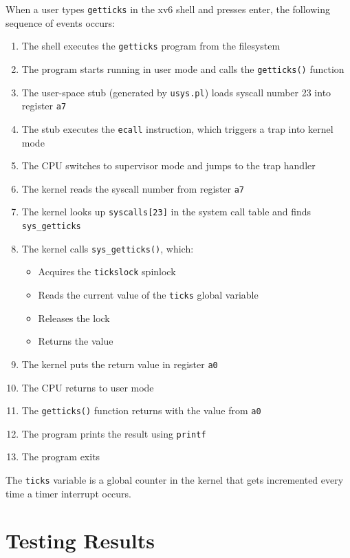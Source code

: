 \documentclass[a4paper]{article}
\begin{document}
When a user types \texttt{getticks} in the xv6 shell and presses enter, the following sequence of events occurs:

\begin{enumerate}
    \item The shell executes the \texttt{getticks} program from the filesystem
    \item The program starts running in user mode and calls the \texttt{getticks()} function
    \item The user-space stub (generated by \texttt{usys.pl}) loads syscall number 23 into register \texttt{a7}
    \item The stub executes the \texttt{ecall} instruction, which triggers a trap into kernel mode
    \item The CPU switches to supervisor mode and jumps to the trap handler
    \item The kernel reads the syscall number from register \texttt{a7}
    \item The kernel looks up \texttt{syscalls[23]} in the system call table and finds \texttt{sys\_getticks}
    \item The kernel calls \texttt{sys\_getticks()}, which:
    \begin{itemize}
        \item Acquires the \texttt{tickslock} spinlock
        \item Reads the current value of the \texttt{ticks} global variable
        \item Releases the lock
        \item Returns the value
    \end{itemize}
    \item The kernel puts the return value in register \texttt{a0}
    \item The CPU returns to user mode
    \item The \texttt{getticks()} function returns with the value from \texttt{a0}
    \item The program prints the result using \texttt{printf}
    \item The program exits
\end{enumerate}

The \texttt{ticks} variable is a global counter in the kernel that gets incremented every time a timer interrupt occurs.

\section{Testing Results}
\end{document}
